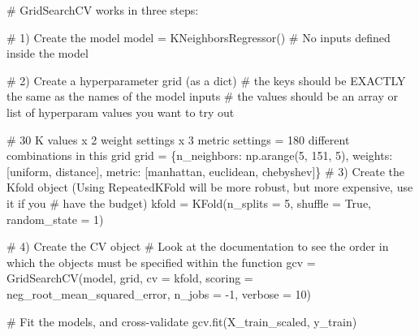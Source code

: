 \documentclass[
  letterpaper,
  DIV=11,
  numbers=noendperiod]{scrreprt}
\newenvironment{Shaded}{\begin{snugshade}}{\end{snugshade}}
\newcommand{\CommentTok}[1]{\textcolor[rgb]{0.37,0.37,0.37}{#1}}
\newcommand{\DecValTok}[1]{\textcolor[rgb]{0.68,0.00,0.00}{#1}}
\newcommand{\NormalTok}[1]{\textcolor[rgb]{0.00,0.23,0.31}{#1}}
\newcommand{\OperatorTok}[1]{\textcolor[rgb]{0.37,0.37,0.37}{#1}}
\newcommand{\StringTok}[1]{\textcolor[rgb]{0.13,0.47,0.30}{#1}}
\newcommand{\VariableTok}[1]{\textcolor[rgb]{0.07,0.07,0.07}{#1}}
\begin{document}
\begin{Shaded}
\begin{Highlighting}[]
\CommentTok{\# GridSearchCV works in three steps:}

\CommentTok{\# 1) Create the model}
\NormalTok{model }\OperatorTok{=}\NormalTok{ KNeighborsRegressor() }\CommentTok{\# No inputs defined inside the model}

\CommentTok{\# 2) Create a hyperparameter grid (as a dict)}
    \CommentTok{\# the keys should be EXACTLY the same as the names of the model inputs}
    \CommentTok{\# the values should be an array or list of hyperparam values you want to try out}
    
\CommentTok{\# 30 K values x 2 weight settings x 3 metric settings = 180 different combinations in this grid}
\NormalTok{grid }\OperatorTok{=}\NormalTok{ \{}\StringTok{\textquotesingle{}n\_neighbors\textquotesingle{}}\NormalTok{: np.arange(}\DecValTok{5}\NormalTok{, }\DecValTok{151}\NormalTok{, }\DecValTok{5}\NormalTok{), }\StringTok{\textquotesingle{}weights\textquotesingle{}}\NormalTok{:[}\StringTok{\textquotesingle{}uniform\textquotesingle{}}\NormalTok{, }\StringTok{\textquotesingle{}distance\textquotesingle{}}\NormalTok{], }
        \StringTok{\textquotesingle{}metric\textquotesingle{}}\NormalTok{: [}\StringTok{\textquotesingle{}manhattan\textquotesingle{}}\NormalTok{, }\StringTok{\textquotesingle{}euclidean\textquotesingle{}}\NormalTok{, }\StringTok{\textquotesingle{}chebyshev\textquotesingle{}}\NormalTok{]\}}
\CommentTok{\# 3) Create the Kfold object (Using RepeatedKFold will be more robust, but more expensive, use it if you }
\CommentTok{\# have the budget)}
\NormalTok{kfold }\OperatorTok{=}\NormalTok{ KFold(n\_splits }\OperatorTok{=} \DecValTok{5}\NormalTok{, shuffle }\OperatorTok{=} \VariableTok{True}\NormalTok{, random\_state }\OperatorTok{=} \DecValTok{1}\NormalTok{)}

\CommentTok{\# 4) Create the CV object}
\CommentTok{\# Look at the documentation to see the order in which the objects must be specified within the function}
\NormalTok{gcv }\OperatorTok{=}\NormalTok{ GridSearchCV(model, grid, cv }\OperatorTok{=}\NormalTok{ kfold, scoring }\OperatorTok{=} \StringTok{\textquotesingle{}neg\_root\_mean\_squared\_error\textquotesingle{}}\NormalTok{, n\_jobs }\OperatorTok{=} \OperatorTok{{-}}\DecValTok{1}\NormalTok{, verbose }\OperatorTok{=} \DecValTok{10}\NormalTok{)}

\CommentTok{\# Fit the models, and cross{-}validate}
\NormalTok{gcv.fit(X\_train\_scaled, y\_train)}
\end{Highlighting}
\end{Shaded}
\end{document}
